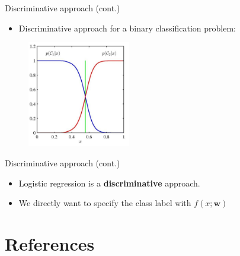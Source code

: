 \documentclass[serif, aspectratio=169]{beamer}
\begin{document}
\begin{frame}{Discriminative approach (cont.)}
    \begin{itemize}
        \item Discriminative approach for a binary classification problem:
    \end{itemize}
    \begin{figure}[h]
      \centering
      \includegraphics[width=0.4\textwidth]{pic/Disc.png}
      \end{figure}
    \vfill
\end{frame}
\begin{frame}{Discriminative approach (cont.)}
    \begin{itemize}
        \item Logistic regression is a \textbf{discriminative} approach.
        \item We directly want to specify the class label with $f(x;\mathbf{w})$
    \end{itemize}
\end{frame}

\section{References}
\end{document}
